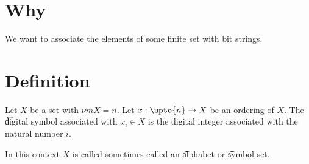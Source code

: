 
\section*{Why}

We want to associate the elements of some finite set with bit strings.

\section*{Definition}

Let $X$ be a set with $\nu m{X} = n$.
Let $x: \upto{n} \to X$ be an ordering of $X$.
The \t{digital symbol} associated with $x_i \in X$ is the digital integer associated with the natural number $i$.

In this context $X$ is called sometimes called an \t{alphabet} or \t{symbol set}.

\blankpage